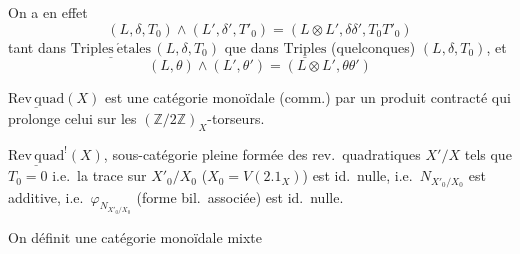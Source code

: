 \documentclass[11pt,a4paper]{article}
\begin{document}

On a en effet
\[
  (L, \delta, T_{0}) \wedge (L', \delta', T'_{0}) = (L \otimes L', \delta\delta', T_{0}T'_{0})
\]
tant dans $\underline{\mathrm{Triples\ \acute{e}tales}}\,(L, \delta, T_{0})$ que dans $\underline{\mathrm{Triples}}$ (quelconques) $(L, \delta, T_{0})$, et
\[
  (L, \theta) \wedge (L', \theta') = (L \otimes L', \theta\theta')
\]

$\underline{\mathrm{Rev\,quad}}(X)$ est une catégorie monoïdale (comm.) par un produit contracté qui prolonge celui sur les $(\mathbb{Z}/2\mathbb{Z})_{X}$-torseurs.

$\underline{\mathrm{Rev\,quad}}^{!}(X)$, sous-catégorie pleine formée des rev.\ quadratiques $X'/X$ tels que $T_{0} = 0$ i.e.\ la trace sur $X'_{0}/X_{0}$ ($X_{0} = V(2.1_{X})$) est id.\ nulle, i.e.\ $N_{X'_{0}/X_{0}}$ est additive, i.e.\ $\varphi_{N_{X'_{0}/X_{0}}}$ (forme bil.\ associée) est id.\ nulle.


On définit une catégorie monoïdale mixte
\end{document}

